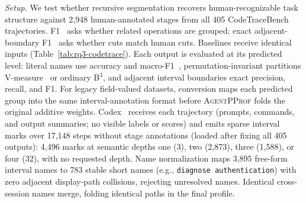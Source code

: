 \documentclass[sigconf,nonacm]{acmart}
\newcommand{\sys}{\textsc{AgentPProf}\xspace}
\begin{document}
\emph{Setup.} We test whether recursive segmentation recovers human-recognizable task structure against 2{,}948 human-annotated stages from all 405 CodeTraceBench trajectories.
F1~\cite{bagga-baldwin-1998-entity-based} asks whether related operations
are grouped; exact adjacent-boundary F1~\cite{ruokolainen2016segmentation}
asks whether cuts match human cuts. Baselines receive identical inputs
(Table~\ref{tab:rq3-codetrace}).
Each output is evaluated at its predicted level: literal names use
accuracy and macro-F1~\cite{lewis2004rcv1}, permutation-invariant partitions
V-measure~\cite{rosenberg-hirschberg-2007-v-measure} or ordinary B$^3$,
and adjacent interval boundaries exact precision, recall, and F1. For
legacy field-valued datasets, conversion maps each predicted group into
the same interval-annotation format before \sys folds the
original additive weights.
Codex~\cite{codex} receives each trajectory (prompts, commands, and output summaries; no visible labels or scores) and emits sparse interval marks over 17{,}148 steps without stage annotations (loaded after fixing all 405 outputs): 4{,}496 marks at semantic depths one (3), two (2{,}873), three (1{,}588), or four (32), with no requested depth.
Name normalization maps 3{,}895 free-form interval names to 783 stable short names (e.g., \texttt{diagnose authentication}) with zero adjacent display-path collisions, rejecting unresolved names. Identical cross-session names merge, folding identical paths in the final profile.
\end{document}
